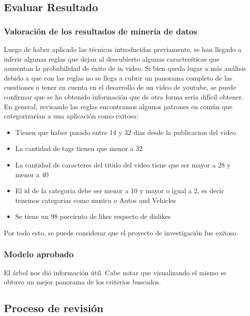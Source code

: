 \subsection{Evaluar Resultado}
    \subsubsection{Valoración de los resultados de minería de datos}

        Luego de haber aplicado las técnicas introducidas previamente, se han
        llegado a inferir algunas reglas que dejan al descubierto algunas
        caracterśticas que aumentan la probabilidad de éxito de in video.
        Si bien queda lugar a más análisis debido a que con las reglas no se
        llega a cubrir un panorama completo de las cuestiones a tener en cuenta
        en el desarrollo de un video de youtube, se puede confirmar que se ha
        obtenido información que de otra forma sería difícil obtener.\\
        En general, revisando las reglas encontramos algunos patrones en común
        que categorizarían a una aplicación como exitosa:
        \begin{itemize}
            \item Tienen que haber pasado entre 14 y 32 dias desde la publicacion del video
            \item La cantidad de tags tienen que menor a 32
            \item La cantidad de caracteres del titulo del video tiene que ser mayor a 28 y menor a 40
            \item El id de la categoria debe ser menor a 10 y mayor o igual a
            2, es decir tenemos categorias como musica o Autos and Vehicles
            \item Se tiene un 98 porciento de likes respecto de dislikes
        \end{itemize}
        Por todo esto, se puede considerar que el proyecto de investigación fue
        exitoso.
    \subsubsection{Modelo aprobado}

        El árbol nos dió información útil. Cabe notar que visualizando el mismo
        se obtuvo un mejor panorama de los criterios buscados.

\subsection{Proceso de revisión}
